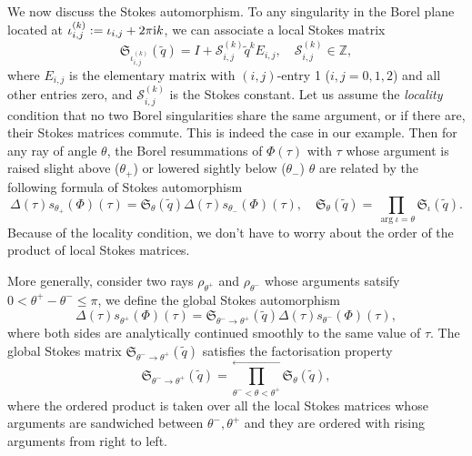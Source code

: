 \documentclass[12pt,reqno]{amsart}
\theoremstyle{definition}
\def\IZ{\mathbb{Z}}
\def\tq{\tilde{q}}
\def\ri{\mathrm{i}}
\def\ri{{\rm i}}
\def\mc{\mathcal}
\def\mf{\mathfrak}
\def\IZ{\mathbb{Z}}
\begin{document}
We now discuss the Stokes automorphism.  To any singularity in the
Borel plane located at $\iota_{i,j}^{(k)}:= \iota_{i,j}+2\pi\ri k$, we
can associate a local Stokes matrix %
\begin{equation}
  \mf{S}_{\iota_{i,j}^{(k)}}(\tq) = I + \mc{S}_{i,j}^{(k)}\tq^k
  E_{i,j},\quad  \mc{S}_{i,j}^{(k)}\in\IZ,
\end{equation}
where $E_{i,j}$ is the elementary matrix with $(i,j)$-entry 1
($i,j=0,1,2$) and all other entries zero, and $\mc{S}_{i,j}^{(k)}$ is
the Stokes constant.  Let us assume the \emph{locality} condition that
no two Borel singularities share the same argument, or if there are,
their Stokes matrices commute.  This is indeed the case in our
example.  Then for any ray of angle $\theta$, the Borel resummations
of $\Phi(\tau)$ with $\tau$ whose argument is raised slight above
($\theta_+$) or lowered sightly below ($\theta_-$) $\theta$ are related
by the following formula of Stokes automorphism 
\begin{equation}
  \Delta(\tau) s_{\theta_+}(\Phi)(\tau) = \mf{S}_{\theta}(\tq)
  \Delta(\tau) s_{\theta_-}(\Phi)(\tau),\quad
  \mf{S}_\theta(\tq) = \prod_{\arg\iota=\theta}\mf{S}_\iota(\tq).
\end{equation}
Because of the locality condition, we don't have to worry about the
order of the product of local Stokes matrices.

More generally, consider two rays $\rho_{\theta^+}$ and
$\rho_{\theta^-}$ whose arguments satsify
$0<\theta^+-\theta^-\leq \pi$, we define the global Stokes
automorphism
\begin{equation}
  \Delta(\tau)s_{\theta^+}(\Phi)(\tau) =
  \mf{S}_{\theta^-\rightarrow \theta^+}(\tq)
  \Delta(\tau)s_{\theta^-}(\Phi)(\tau),
  \label{eq:S-glob}
\end{equation}
where both sides are analytically continued smoothly to the same value
of $\tau$.  The global Stokes matrix
$\mf{S}_{\theta^-\rightarrow\theta^+}(\tq)$ satisfies the
factorisation property~\cite{GGM:resurgent,GGM:peacock}
\begin{equation}
  \mf{S}_{\theta^-\rightarrow\theta^+}(\tq) =
  \prod_{\theta^-<\theta<\theta^+}^{\leftarrow}
  \mf{S}_{\theta}(\tq),
  \label{eq:S-fac}
\end{equation}
where the ordered product is taken over all the local Stokes matrices
whose arguments are sandwiched between $\theta^-,\theta^+$ and they
are ordered with rising arguments from right to left.
\end{document}
